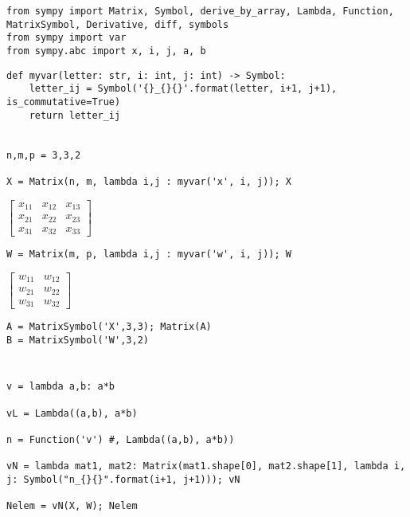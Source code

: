 \documentclass[
]{article}
\author{}
\date{}
\begin{document}
\begin{verbatim}
from sympy import Matrix, Symbol, derive_by_array, Lambda, Function, MatrixSymbol, Derivative, diff, symbols
from sympy import var
from sympy.abc import x, i, j, a, b
\end{verbatim}

\begin{verbatim}
def myvar(letter: str, i: int, j: int) -> Symbol:
    letter_ij = Symbol('{}_{}{}'.format(letter, i+1, j+1), is_commutative=True)
    return letter_ij


n,m,p = 3,3,2

X = Matrix(n, m, lambda i,j : myvar('x', i, j)); X
\end{verbatim}

\(\displaystyle \left[\begin{matrix}x_{11} & x_{12} & x_{13}\\x_{21} & x_{22} & x_{23}\\x_{31} & x_{32} & x_{33}\end{matrix}\right]\)

\begin{verbatim}
W = Matrix(m, p, lambda i,j : myvar('w', i, j)); W
\end{verbatim}

\(\displaystyle \left[\begin{matrix}w_{11} & w_{12}\\w_{21} & w_{22}\\w_{31} & w_{32}\end{matrix}\right]\)

\begin{verbatim}
A = MatrixSymbol('X',3,3); Matrix(A)
B = MatrixSymbol('W',3,2)
\end{verbatim}

\begin{verbatim}

\end{verbatim}

\begin{verbatim}

\end{verbatim}

\begin{verbatim}
v = lambda a,b: a*b

vL = Lambda((a,b), a*b)

n = Function('v') #, Lambda((a,b), a*b))

vN = lambda mat1, mat2: Matrix(mat1.shape[0], mat2.shape[1], lambda i, j: Symbol("n_{}{}".format(i+1, j+1))); vN

Nelem = vN(X, W); Nelem
\end{verbatim}
\end{document}
